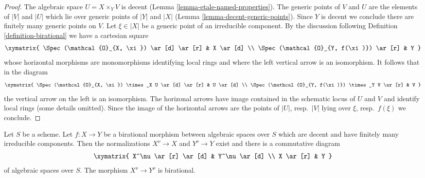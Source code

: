 \begin{proof}
The algebraic space $U = X \times_Y V$ is decent
(Lemma \ref{lemma-etale-named-properties}).
The generic points of $V$ and $U$ are the elements of $|V|$ and $|U|$
which lie over generic points of $|Y|$ and $|X|$
(Lemma \ref{lemma-decent-generic-points}).
Since $Y$ is decent we conclude there are finitely many generic points
on $V$. Let $\xi \in |X|$ be a generic point of an irreducible component.
By the discussion following Definition \ref{definition-birational}
we have a cartesian square
$$
\xymatrix{
\Spec(\mathcal{O}_{X, \xi}) \ar[d] \ar[r] & X \ar[d] \\
\Spec(\mathcal{O}_{Y, f(\xi)}) \ar[r] & Y
}
$$
whose horizontal morphisms are monomorphisms identifying local rings
and where the left vertical arrow is an isomorphism. It follows that
in the diagram
$$
\xymatrix{
\Spec(\mathcal{O}_{X, \xi}) \times_X U \ar[d] \ar[r] & U \ar[d] \\
\Spec(\mathcal{O}_{Y, f(\xi)}) \times_Y V \ar[r] & V
}
$$
the vertical arrow on the left is an isomorphism. The horizonal arrows
have image contained in the schematic locus of $U$ and $V$ and
identify local rings (some details omitted). Since the image of
the horizontal arrows are the points of $|U|$, resp.\ $|V|$
lying over $\xi$, resp.\ $f(\xi)$ we conclude.
\end{proof}

\begin{lemma}
\label{lemma-birational-induced-morphism-normalizations}
Let $S$ be a scheme. Let $f : X \to Y$ be a birational morphism between
algebraic spaces over $S$ which are decent and have finitely many irreducible
components. Then the normalizations $X^\nu \to X$ and $Y^\nu \to Y$ exist
and there is a commutative diagram
$$
\xymatrix{
X^\nu \ar[r] \ar[d] &  Y^\nu \ar[d] \\
X \ar[r] & Y
}
$$
of algebraic spaces over $S$. The morphism $X^\nu \to Y^\nu$ is birational.
\end{lemma}

